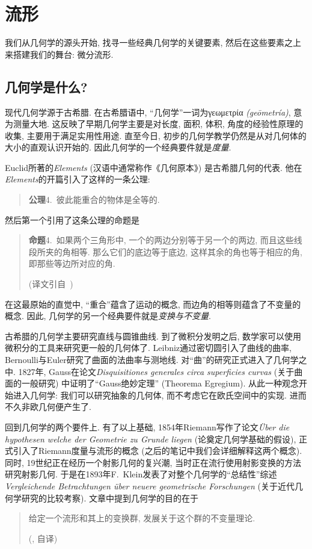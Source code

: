 \chapter{流形}
我们从几何学的源头开始, 找寻一些经典几何学的关键要素, 然后在这些要素之上来搭建我们的舞台: 微分流形.
\section{几何学是什么?}
现代几何学源于古希腊.
在古希腊语中, ``几何学''一词为γεωμετρία \textit{(geōmetría)}, 意为测量大地.
这反映了早期几何学主要是对长度, 面积, 体积, 角度的经验性原理的收集, 主要用于满足实用性用途.
直至今日, 初步的几何学教学仍然是从对几何体的大小的直观认识开始的.
因此几何学的一个经典要件就是\emph{度量}.

Euclid所著的\textit{Elements} (汉语中通常称作《几何原本》) 是古希腊几何的代表.
他在\textit{Elements}的开篇引入了这样的一条公理:
\begin{quotation}
    {\bfseries 公理}4.\ 彼此能重合的物体是全等的.
\end{quotation}
然后第一个引用了这条公理的命题是
\begin{quotation}
    {\bfseries 命题}4.\ 如果两个三角形中, 一个的两边分别等于另一个的两边, 而且这些线段所夹的角相等.
    那么它们的底边等于底边, 这样其余的角也等于相应的角, 即那些等边所对应的角.
    \begin{flushright}
        (译文引自~\parencite{Euclid_Elem})
    \end{flushright}
\end{quotation}
在这最原始的直觉中, ``重合''蕴含了运动的概念, 而边角的相等则蕴含了不变量的概念.
因此, 几何学的另一个经典要件就是\emph{变换与不变量}.

古希腊的几何学主要研究直线与圆锥曲线.
到了微积分发明之后, 数学家可以使用微积分的工具来研究更一般的几何体了.
Leibniz通过密切圆引入了曲线的曲率, Bernoulli与Euler研究了曲面的法曲率与测地线.
对``曲''的研究正式进入了几何学之中.
1827年, Gauss在论文\textit{Disquisitiones generales circa superficies curvas} (关于曲面的一般研究) 中证明了``Gauss绝妙定理'' (Theorema Egregium).
从此一种观念开始进入几何学: 我们可以研究抽象的几何体, 而不考虑它在欧氏空间中的实现.
进而不久非欧几何便产生了.

回到几何学的两个要件上.
有了以上基础, 1854年Riemann写作了论文\textit{\"{U}ber die hypothesen welche der Geometrie zu Grunde liegen} (论奠定几何学基础的假设), 正式引入了Riemann度量与流形的概念 (之后的笔记中我们会详细解释这两个概念).
同时, 19世纪正在经历一个射影几何的复兴潮, 当时正在流行使用射影变换的方法研究射影几何.
于是在1893年F.\ Klein发表了对整个几何学的``总结性''综述\textit{Vergleichende Betrachtungen \"{u}ber neuere geometrische Forschungen} (关于近代几何学研究的比较考察).
文章中提到几何学的目的在于
\begin{quotation}
    给定一个流形和其上的变换群, 发展关于这个群的不变量理论.
    \begin{flushright}
        (\parencite{Klein_Erlangen}, 自译)
    \end{flushright}
\end{quotation}

